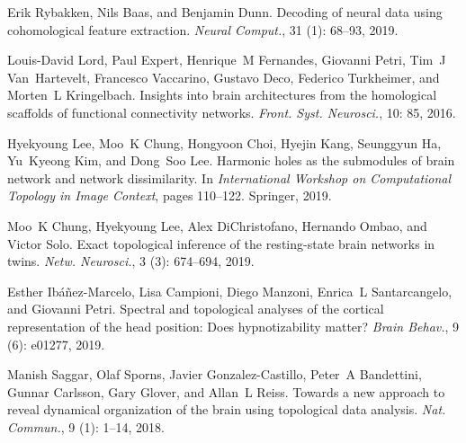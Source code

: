 Erik Rybakken, Nils Baas, and Benjamin Dunn.
\newblock Decoding of neural data using cohomological feature extraction.
\newblock \emph{Neural Comput.}, 31 (1): 68--93, 2019.

Louis-David Lord, Paul Expert, Henrique~M Fernandes, Giovanni Petri, Tim~J
Van~Hartevelt, Francesco Vaccarino, Gustavo Deco, Federico Turkheimer, and
Morten~L Kringelbach.
\newblock Insights into brain architectures from the homological scaffolds of
functional connectivity networks.
\newblock \emph{Front. Syst. Neurosci.}, 10: 85, 2016.

Hyekyoung Lee, Moo~K Chung, Hongyoon Choi, Hyejin Kang, Seunggyun Ha, Yu~Kyeong
Kim, and Dong~Soo Lee.
\newblock Harmonic holes as the submodules of brain network and network
dissimilarity.
\newblock In \emph{International Workshop on Computational Topology in Image
    Context}, pages 110--122. {Springer}, 2019.

Moo~K Chung, Hyekyoung Lee, Alex DiChristofano, Hernando Ombao, and Victor
Solo.
\newblock Exact topological inference of the resting-state brain networks in
twins.
\newblock \emph{Netw. Neurosci.}, 3 (3): 674--694, 2019.

Esther {Ib{\'a}{\~n}ez-Marcelo}, Lisa Campioni, Diego Manzoni, Enrica~L
Santarcangelo, and Giovanni Petri.
\newblock Spectral and topological analyses of the cortical representation of
the head position: {{Does}} hypnotizability matter?
\newblock \emph{Brain Behav.}, 9 (6): e01277,
2019{}.

Manish Saggar, Olaf Sporns, Javier {Gonzalez-Castillo}, Peter~A Bandettini,
Gunnar Carlsson, Gary Glover, and Allan~L Reiss.
\newblock Towards a new approach to reveal dynamical organization of the brain
using topological data analysis.
\newblock \emph{Nat. Commun.}, 9 (1): 1--14, 2018.

